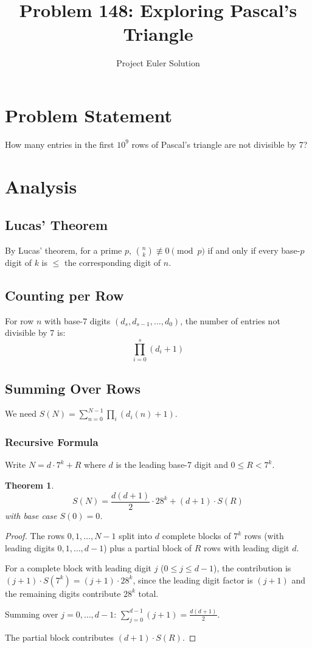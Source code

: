 \documentclass[12pt]{article}
\title{Problem 148: Exploring Pascal's Triangle}
\author{Project Euler Solution}
\date{}
\newtheorem{theorem}{Theorem}
\theoremstyle{definition}
\begin{document}
\maketitle

\section{Problem Statement}
How many entries in the first $10^9$ rows of Pascal's triangle are not divisible by 7?

\section{Analysis}

\subsection{Lucas' Theorem}
By Lucas' theorem, for a prime $p$, $\binom{n}{k} \not\equiv 0 \pmod{p}$ if and only if every base-$p$ digit of $k$ is $\le$ the corresponding digit of $n$.

\subsection{Counting per Row}
For row $n$ with base-7 digits $(d_s, d_{s-1}, \ldots, d_0)$, the number of entries not divisible by 7 is:
\[
\prod_{i=0}^{s} (d_i + 1)
\]

\subsection{Summing Over Rows}
We need $S(N) = \sum_{n=0}^{N-1} \prod_i (d_i(n)+1)$.

\subsubsection{Recursive Formula}
Write $N = d \cdot 7^k + R$ where $d$ is the leading base-7 digit and $0 \le R < 7^k$.

\begin{theorem}
\[
S(N) = \frac{d(d+1)}{2} \cdot 28^k + (d+1) \cdot S(R)
\]
with base case $S(0) = 0$.
\end{theorem}

\begin{proof}
The rows $0, 1, \ldots, N-1$ split into $d$ complete blocks of $7^k$ rows (with leading digits $0, 1, \ldots, d-1$) plus a partial block of $R$ rows with leading digit $d$.

For a complete block with leading digit $j$ ($0 \le j \le d-1$), the contribution is $(j+1) \cdot S(7^k) = (j+1) \cdot 28^k$, since the leading digit factor is $(j+1)$ and the remaining digits contribute $28^k$ total.

Summing over $j = 0, \ldots, d-1$: $\sum_{j=0}^{d-1}(j+1) = \frac{d(d+1)}{2}$.

The partial block contributes $(d+1) \cdot S(R)$.
\end{proof}
\end{document}
